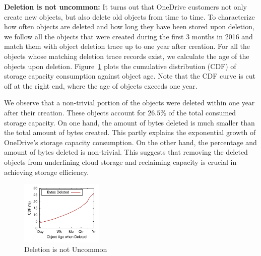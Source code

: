 {\bf Deletion is not uncommon:} It turns out that OneDrive customers not only
create new objects, but also delete old objects from time to time. To
characterize how often objects are deleted and how long they have been stored
upon deletion, we follow all the objects that were created during the first 3
months in 2016 and match them with object deletion trace up to one year after
creation. For all the objects whose matching deletion trace records exist, we
calculate the age of the objects upon deletion. Figure~\ref{fig:deletion} plots
the cumulative distribution (CDF) of storage capacity consumption against object
age. Note that the CDF curve is cut off at the right end, where the age of
objects exceeds one year.

We observe that a non-trivial portion of the objects were deleted within one
year after their creation. These objects account for $26.5\%$ of the total
consumed storage capacity. On one hand, the amount of bytes deleted is much
smaller than the total amount of bytes created. This partly explains the
exponential growth of OneDrive's storage capacity consumption. On the other
hand, the percentage and amount of bytes deleted is non-trivial. This suggests
that removing the deleted objects from underlining cloud storage and reclaiming
capacity is crucial in achieving storage efficiency.

\begin{figure}[tp]
\centering
\includegraphics[width=0.35\textwidth]{data/age-bytes}
\caption{Deletion is not Uncommon}
\label{fig:deletion}
\end{figure}

